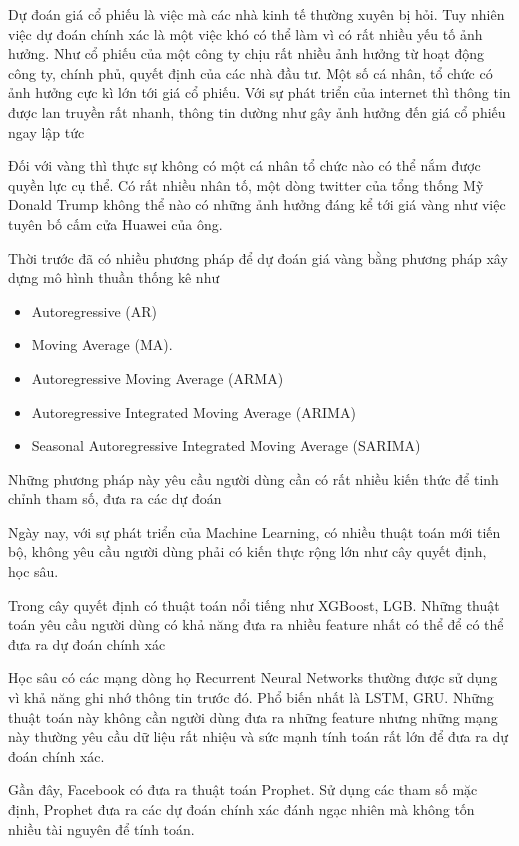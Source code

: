 Dự đoán giá cổ phiếu là việc mà các nhà kinh tế thường xuyên bị hỏi.
Tuy nhiên việc dự đoán chính xác là một việc khó có thể làm vì có rất nhiều yếu tố ảnh hưởng.
Như cổ phiếu của một công ty chịu rất nhiều ảnh hưởng từ hoạt động công ty, chính phủ, quyết định của các nhà đầu tư.
Một số cá nhân, tổ chức có ảnh hưởng cực kì lớn tới giá cổ phiếu.
Với sự phát triển của internet thì thông tin được lan truyền rất nhanh, thông tin dường như gây ảnh hưởng đến giá cổ phiếu ngay lập tức

Đối với vàng thì thực sự không có một cá nhân tổ chức nào có thể nắm được quyền lực cụ thể.
Có rất nhiều nhân tố, một dòng twitter của tổng thống Mỹ Donald Trump không thể nào có những ảnh hưởng đáng kể tới giá vàng như việc tuyên bố cấm cửa Huawei của ông.

Thời trước đã có nhiều phương pháp để dự đoán giá vàng bằng phương pháp xây dựng mô hình thuần thống kê như
\begin{itemize}
    \item Autoregressive (AR)
    \item Moving Average (MA).
    \item Autoregressive Moving Average (ARMA)
    \item Autoregressive Integrated Moving Average (ARIMA)
    \item Seasonal Autoregressive Integrated Moving Average (SARIMA)
\end{itemize}
Những phương pháp này yêu cầu người dùng cần có rất nhiều kiến thức để tinh chỉnh tham số, đưa ra các dự đoán

Ngày nay, với sự phát triển của Machine Learning, có nhiều thuật toán mới tiến bộ, không yêu cầu người dùng phải
có kiến thực rộng lớn như cây quyết định, học sâu.

Trong cây quyết định có thuật toán nổi tiếng như XGBoost, LGB. Những thuật toán yêu cầu người dùng có khả năng đưa ra nhiều feature nhất có thể
để có thể đưa ra dự đoán chính xác

Học sâu có các mạng dòng họ Recurrent Neural Networks thường được sử dụng vì khả năng ghi nhớ thông tin trước đó. Phổ biến nhất là LSTM, GRU. Những thuật toán
này không cần người dùng đưa ra những feature nhưng những mạng này thường yêu cầu dữ liệu rất nhiệu và sức mạnh tính toán rất lớn để đưa ra dự đoán chính xác.

Gần đây, Facebook có đưa ra thuật toán Prophet. Sử dụng các tham số mặc định, Prophet đưa ra các dự đoán chính xác đánh ngạc nhiên mà không
tốn nhiều tài nguyên để tính toán.

